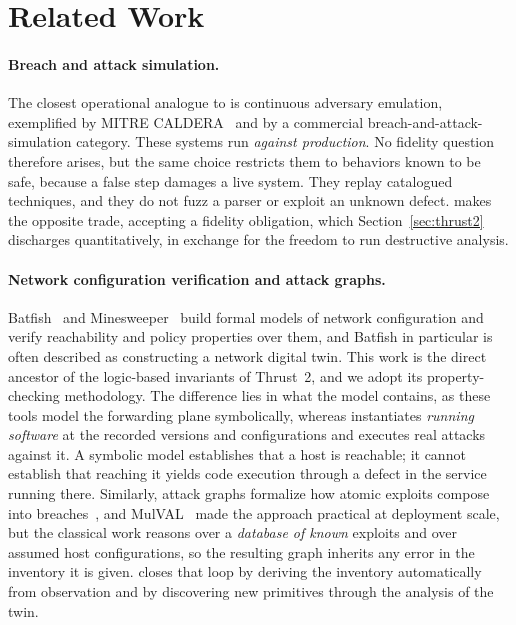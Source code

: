 \section{Related Work}
\label{sec:relwork}

\paragraph{Breach and attack simulation.}
The closest operational analogue to \sysname is continuous adversary
emulation, exemplified by MITRE CALDERA~\cite{caldera} and by a commercial
breach-and-attack-simulation category. These systems run \emph{against production}. No fidelity question therefore
arises, but the same choice restricts them to behaviors known to be safe,
because a false step damages a live system. They replay
catalogued techniques, and they do not fuzz a parser or exploit an unknown
defect. \sysname makes the opposite trade, accepting a fidelity obligation,
which Section~\ref{sec:thrust2} discharges quantitatively, in exchange for
the freedom to run destructive analysis.

\paragraph{Network configuration verification and attack graphs.}
Batfish~\cite{batfish} and Minesweeper~\cite{minesweeper} build formal models
of network configuration and verify reachability and policy properties over
them, and Batfish in particular is often described as constructing a network
digital twin. This work is the direct ancestor of the logic-based invariants
of Thrust~2, and we adopt its property-checking methodology. The difference
lies in what the model contains, as these tools model the forwarding plane
symbolically, whereas \sysname instantiates \emph{running software} at the
recorded versions and configurations and executes real attacks against it. A symbolic model establishes that a host is reachable; it cannot establish
that reaching it yields code execution through a defect in the service running
there.
Similarly, attack graphs formalize how atomic exploits compose into
breaches~\cite{attackgraphs}, and MulVAL~\cite{mulval} made the approach
practical at deployment scale, but the classical work reasons over a
\emph{database of known} exploits and over assumed host configurations, so the resulting graph inherits any
error in the inventory it is given. \sysname
closes that loop by deriving the inventory automatically from observation and
by discovering new primitives through the analysis of the twin.


